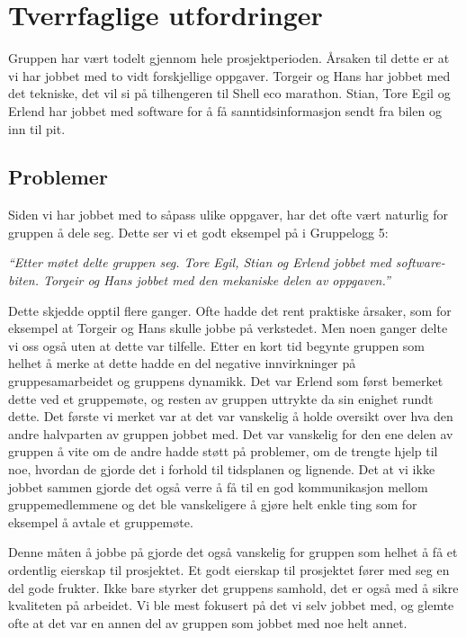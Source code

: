 \section{Tverrfaglige utfordringer}
Gruppen har vært todelt gjennom hele prosjektperioden. Årsaken til dette er at vi har jobbet med to vidt forskjellige oppgaver. Torgeir og Hans har jobbet med det tekniske, det vil si på tilhengeren til Shell eco marathon. Stian, Tore Egil og Erlend har jobbet med software for å få sanntidsinformasjon sendt fra bilen og inn til pit.

\subsection{Problemer}
Siden vi har jobbet med to såpass ulike oppgaver, har det ofte vært naturlig for gruppen å dele seg. Dette ser vi et godt eksempel på i Gruppelogg 5: \newline

\emph{``Etter møtet delte gruppen seg. Tore Egil, Stian og Erlend jobbet med software-biten. Torgeir
og Hans jobbet med den mekaniske delen av oppgaven.''}\newline

Dette skjedde opptil flere ganger. Ofte hadde det rent praktiske årsaker, som for eksempel at Torgeir og Hans skulle jobbe på verkstedet. Men noen ganger delte vi oss også uten at dette var tilfelle. Etter en kort tid begynte gruppen som helhet å merke at dette hadde en del negative innvirkninger på gruppesamarbeidet og gruppens dynamikk. Det var Erlend som først bemerket dette ved et gruppemøte, og resten av gruppen uttrykte da sin enighet rundt dette.
Det første vi merket var at det var vanskelig å holde oversikt over hva den andre halvparten av gruppen jobbet med. Det var vanskelig for den ene delen av gruppen å vite om de andre hadde støtt på problemer, om de trengte hjelp til noe, hvordan de gjorde det i forhold til tidsplanen og lignende. Det at vi ikke jobbet sammen gjorde det også verre å få til en god kommunikasjon mellom gruppemedlemmene og det ble vanskeligere å gjøre helt enkle ting som for eksempel å avtale et gruppemøte. \newline

Denne måten å jobbe på gjorde det også vanskelig for gruppen som helhet å få et ordentlig eierskap til prosjektet. Et godt eierskap til prosjektet fører med seg en del gode frukter. Ikke bare styrker det gruppens samhold, det er også med å sikre kvaliteten på arbeidet. Vi ble mest fokusert på det vi selv jobbet med, og glemte ofte at det var en annen del av gruppen som jobbet med noe helt annet. 

